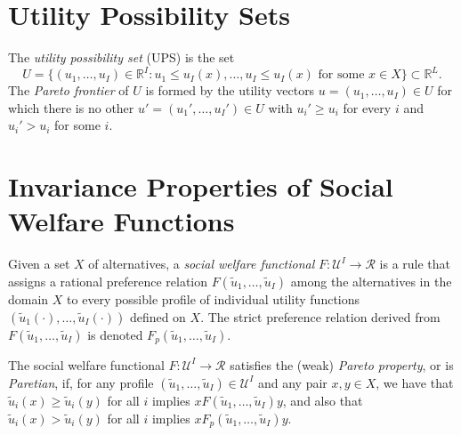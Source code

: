 \addtocounter{section}{1}

\section{Utility Possibility Sets}

\begin{defn}
    The \emph{utility possibility set} (UPS) is the set
    \begin{equation*}
        U = \{(u_1, \dots, u_I) \in \mathbb{R}^I : u_1 \leq u_I(x), \dots, u_I \leq u_I(x) \text{ for some } x \in X\} \subset \mathbb{R}^L.
    \end{equation*}
    The \emph{Pareto frontier} of $U$ is formed by the utility vectors $u = (u_1, \dots, u_I) \in U$ for which there is no other $u' = (u_1', \dots, u_I') \in U$ with $u_i' \geq u_i$ for every $i$ and $u_i' > u_i$ for some $i$.
\end{defn}


\addtocounter{section}{1}


\section{Invariance Properties of Social Welfare Functions}

\begin{defn}
    Given a set $X$ of alternatives, a \emph{social welfare functional} $F : \mathscr{U}^I \to \mathscr{R}$ is a rule that assigns a rational preference relation $F (\tilde{u}_1, \dots, \tilde{u}_I)$ among the alternatives in the domain $X$ to every possible profile of individual utility functions $(\tilde{u}_1(\cdot), \dots, \tilde{u}_I(\cdot))$ defined on $X$. The strict preference relation derived from $F (\tilde{u}_1, \dots, \tilde{u}_I)$ is denoted $F_p (\tilde{u}_1, \dots, \tilde{u}_I)$.
\end{defn}

\begin{defn}
    The social welfare functional $F : \mathscr{U}^I \to \mathscr{R}$ satisfies the (weak) \emph{Pareto property}, or is \emph{Paretian}, if, for any profile $(\tilde{u}_1, \dots, \tilde{u}_I) \in \mathscr{U}^I$ and any pair $x, y \in X$, we have that $\tilde{u}_i(x) \geq \tilde{u}_i(y)$ for all $i$ implies $x F (\tilde{u}_1, \dots, \tilde{u}_I) y$, and also that $\tilde{u}_i(x) > \tilde{u}_i(y)$ for all $i$ implies $x F_p (\tilde{u}_1, \dots, \tilde{u}_I) y$.
\end{defn}

